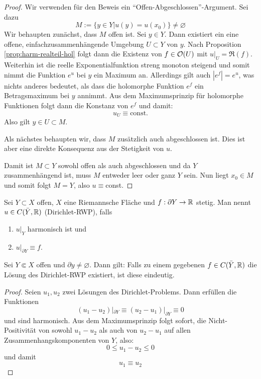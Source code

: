 \begin{proof}
  Wir verwenden für den Beweis ein
  "`Offen-Abgeschlossen"'-Argument. Sei dazu
  \[
  M:= \{ y \in Y| u(y) = u(x_0)\} \neq \varnothing
  \]
  Wir behaupten zunächst, dass $M$ offen ist.
  Sei $y \in Y$. Dann existiert ein eine offene,
  einfachzusammenhängende Umgebung $U \subset Y$ von $y$. 
  Nach Proposition \ref{prop:harm-realteil-hol} folgt dann die
  Existenz von $f \in \mathcal{O}(U)$ mit $u|_U = \Re(f)$.
  Weiterhin ist die reelle Exponentialfunktion streng monoton
  steigend und somit nimmt die Funktion $e^u$ bei $y$ ein Maximum
  an. Allerdings gilt auch $|e^f| = e^u$, was nichts anderes
  bedeutet, als dass die holomorphe Funktion $e^f$ ein
  Betragsmaximum bei $y$ annimmt. 
  Aus dem Maximumsprinzip für holomorphe Funktionen folgt dann die
  Konstanz von $e^f$ und damit:
  \[
  u_U \equiv \text{const.}
  \]
  Also gilt $y \in U \subset M$.
  
  Als nächstes behaupten wir, dass $M$ zusätzlich auch abgeschlossen
  ist. Dies ist aber eine direkte Konsequenz aus der Stetigkeit von $u$.

  Damit ist $M \subset Y$ sowohl offen als auch abgeschlossen und da
  $Y$ zusammenhängend ist, muss $M$ entweder leer oder ganz $Y$
  sein. Nun liegt $x_0 \in M$ und somit folgt $M = Y$, also $u \equiv$const.
\end{proof}

\begin{defin}
  \label{defin:rwp}
  Sei $Y\subset X$ offen, $X$ eine Riemannsche Fläche und $f: \partial
  Y \rightarrow \mathbb{R}$ stetig. Man nennt $u \in C(\bar Y, \mathbb{R})$  (Dirichlet-RWP), falls
  \begin{enumerate}
  \item $u|_Y$ harmonisch ist und
  \item $u|_{\partial Y} \equiv f$.
  \end{enumerate}
\end{defin}

\begin{prop}
  \label{prop:dirichlet-eindeutig}
  Sei $Y \Subset X$ offen und $\partial y \neq \varnothing$. Dann
  gilt: Falls zu einem gegebenen $f \in C(\bar Y, \mathbb{R})$ die Lösung des
  Dirichlet-RWP existiert, ist diese eindeutig.
\end{prop}

\begin{proof}
  Seien $u_1, u_2$ zwei Lösungen des Dirichlet-Problems. Dann erfüllen
  die Funktionen
  \[
  (u_1 - u_2)|_{\partial Y} \equiv (u_2 - u_1)|_{\partial Y} \equiv 0
  \]
  und sind harmonisch. Aus dem Maximumsprinzip folgt sofort, die
  Nicht-Positivität von sowohl $u_1 - u_2$ als auch von $u_2 - u_1$
  auf allen Zusammenhangskomponenten von $Y$, also:
  \[
  0 \leq u_1 - u_2 \leq 0
  \]
  und damit
  \[
  u_1 \equiv u_2
  \]
\end{proof}


